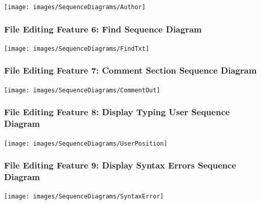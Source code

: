 \documentclass[twoside,letterpaper]{article}
\begin{document}
	\bigskip
	
	\texttt{[image: images/SequenceDiagrams/Author]}
	
	\newpage
	
	\subsubsection[File Editing Feature 6: Find Sequence Diagram]{\rmfamily\bfseries\color{black}
		File Editing Feature 6: Find Sequence Diagram}
	\hypertarget{RefHeading22059017292}{}
	
	\bigskip
	
	\texttt{[image: images/SequenceDiagrams/FindTxt]}
	
	\newpage
	
	\subsubsection[File Editing Feature 7: Comment Section Sequence Diagram]{\rmfamily\bfseries\color{black}
		File Editing Feature 7: Comment Section Sequence Diagram}
	\hypertarget{RefHeading22059017292}{}
	
	\bigskip
	
	\texttt{[image: images/SequenceDiagrams/CommentOut]}
	
	\newpage
	
	\subsubsection[File Editing Feature 8: Display Typing User Sequence Diagram]{\rmfamily\bfseries\color{black}
		File Editing Feature 8: Display Typing User Sequence Diagram}
	\hypertarget{RefHeading22059017292}{}
	
	\bigskip
	
	\texttt{[image: images/SequenceDiagrams/UserPosition]}
	
	\newpage
	
	\subsubsection[File Editing Feature 9: Display Syntax Errors Sequence Diagram]{\rmfamily\bfseries\color{black}
		File Editing Feature 9: Display Syntax Errors Sequence Diagram}
	\hypertarget{RefHeading22059017292}{}
	
	\bigskip
	
	\texttt{[image: images/SequenceDiagrams/SyntaxError]}
	
\end{document}
